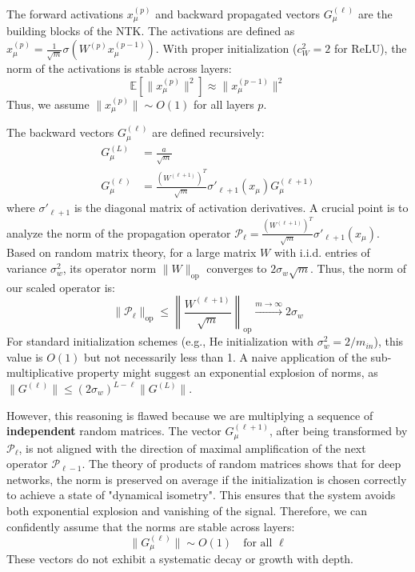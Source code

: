 \documentclass[11pt,a4paper]{article}
\begin{document}
The forward activations $x^{(p)}_\mu$ and backward propagated vectors $G^{(\ell)}_\mu$ are the building blocks of the NTK.
The activations are defined as $x^{(p)}_\mu = \frac{1}{\sqrt{m}}\sigma(W^{(p)} x^{(p-1)}_\mu)$. With proper initialization ($c_W^2=2$ for ReLU), the norm of the activations is stable across layers:
\begin{equation}
    \mathbb{E}[\|x^{(p)}_\mu\|^2] \approx \|x^{(p-1)}_\mu\|^2
\end{equation}
Thus, we assume $\|x^{(p)}_\mu\| \sim O(1)$ for all layers $p$.

The backward vectors $G^{(\ell)}_\mu$ are defined recursively:
\begin{align}
    G^{(L)}_\mu &= \frac{a}{\sqrt{m}} \\
    G^{(\ell)}_\mu &= \frac{(W^{(\ell+1)})^T}{\sqrt{m}} \sigma'_{\ell+1}(x_\mu) G^{(\ell+1)}_\mu
\end{align}
where $\sigma'_{\ell+1}$ is the diagonal matrix of activation derivatives. A crucial point is to analyze the norm of the propagation operator $\mathcal{P}_\ell = \frac{(W^{(\ell+1)})^T}{\sqrt{m}} \sigma'_{\ell+1}(x_\mu)$. Based on random matrix theory, for a large matrix $W$ with i.i.d. entries of variance $\sigma_w^2$, its operator norm $\|W\|_{\text{op}}$ converges to $2\sigma_w\sqrt{m}$. Thus, the norm of our scaled operator is:
\begin{equation}
    \|\mathcal{P}_\ell\|_{\text{op}} \le \left\| \frac{W^{(\ell+1)}}{\sqrt{m}} \right\|_{\text{op}} \xrightarrow{m\to\infty} 2\sigma_w
\end{equation}
For standard initialization schemes (e.g., He initialization with $\sigma_w^2=2/m_{in}$), this value is $O(1)$ but not necessarily less than 1. A naive application of the sub-multiplicative property might suggest an exponential explosion of norms, as $\|G^{(\ell)}\| \le (2\sigma_w)^{L-\ell} \|G^{(L)}\|$.

However, this reasoning is flawed because we are multiplying a sequence of \textbf{independent} random matrices. The vector $G^{(\ell+1)}_\mu$, after being transformed by $\mathcal{P}_\ell$, is not aligned with the direction of maximal amplification of the next operator $\mathcal{P}_{\ell-1}$. The theory of products of random matrices shows that for deep networks, the norm is preserved on average if the initialization is chosen correctly to achieve a state of "dynamical isometry". This ensures that the system avoids both exponential explosion and vanishing of the signal. Therefore, we can confidently assume that the norms are stable across layers:
\begin{equation}
    \|G^{(\ell)}_\mu\| \sim O(1) \quad \text{for all } \ell
\end{equation}
These vectors do not exhibit a systematic decay or growth with depth.
\end{document}
